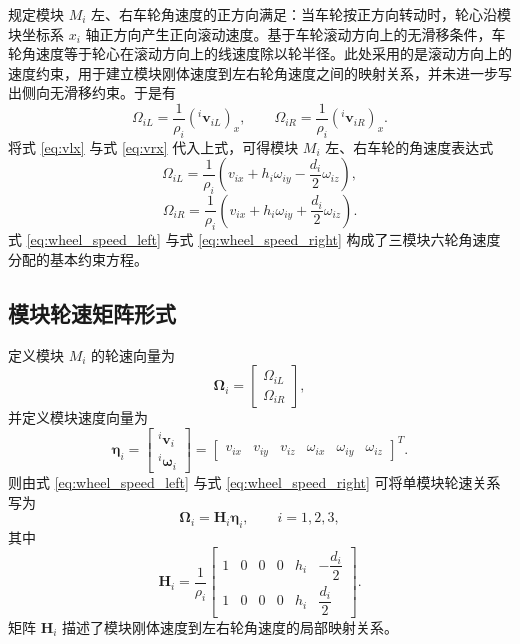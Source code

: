 规定模块 $M_i$ 左、右车轮角速度的正方向满足：当车轮按正方向转动时，轮心沿模块坐标系 $x_i$ 轴正方向产生正向滚动速度。基于车轮滚动方向上的无滑移条件，车轮角速度等于轮心在滚动方向上的线速度除以轮半径。此处采用的是滚动方向上的速度约束，用于建立模块刚体速度到左右轮角速度之间的映射关系，并未进一步写出侧向无滑移约束。于是有
\begin{equation}
\Omega_{iL}
=
\frac{1}{\rho_i}({}^{i}\mathbf v_{iL})_x,
\qquad
\Omega_{iR}
=
\frac{1}{\rho_i}({}^{i}\mathbf v_{iR})_x.
\end{equation}
将式 \eqref{eq:vlx} 与式 \eqref{eq:vrx} 代入上式，可得模块 $M_i$ 左、右车轮的角速度表达式
\begin{equation}
\Omega_{iL}
=
\frac{1}{\rho_i}
\left(
v_{ix}
+
h_i\omega_{iy}
-\frac{d_i}{2}\omega_{iz}
\right),
\label{eq:wheel_speed_left}
\end{equation}
\begin{equation}
\Omega_{iR}
=
\frac{1}{\rho_i}
\left(
v_{ix}
+
h_i\omega_{iy}
+
\frac{d_i}{2}\omega_{iz}
\right).
\label{eq:wheel_speed_right}
\end{equation}
式 \eqref{eq:wheel_speed_left} 与式 \eqref{eq:wheel_speed_right} 构成了三模块六轮角速度分配的基本约束方程。

\subsection{模块轮速矩阵形式}

定义模块 $M_i$ 的轮速向量为
\begin{equation}
\boldsymbol\Omega_i=
\begin{bmatrix}
\Omega_{iL}\\
\Omega_{iR}
\end{bmatrix},
\end{equation}
并定义模块速度向量为
\begin{equation}
\boldsymbol\eta_i=
\begin{bmatrix}
{}^{i}\mathbf v_i\\
{}^{i}\boldsymbol\omega_i
\end{bmatrix}
=
\begin{bmatrix}
v_{ix} & v_{iy} & v_{iz} & \omega_{ix} & \omega_{iy} & \omega_{iz}
\end{bmatrix}^{T}.
\end{equation}
则由式 \eqref{eq:wheel_speed_left} 与式 \eqref{eq:wheel_speed_right} 可将单模块轮速关系写为
\begin{equation}
\boldsymbol\Omega_i
=
\mathbf H_i\boldsymbol\eta_i,
\qquad i=1,2,3,
\label{eq:Hi_eta}
\end{equation}
其中
\begin{equation}
\mathbf H_i
=
\frac{1}{\rho_i}
\begin{bmatrix}
1 & 0 & 0 & 0 & h_i & -\dfrac{d_i}{2}\\[4pt]
1 & 0 & 0 & 0 & h_i & \dfrac{d_i}{2}
\end{bmatrix}.
\label{eq:Hi}
\end{equation}
矩阵 $\mathbf H_i$ 描述了模块刚体速度到左右轮角速度的局部映射关系。

